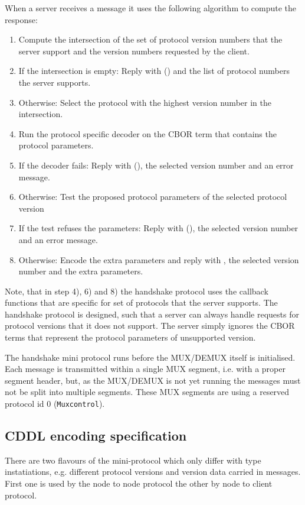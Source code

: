 When a server receives a \ProposeVersions{} message it uses the following algorithm to
compute the response:
\begin{enumerate}
\item
  Compute the intersection of the set of protocol version numbers that the server support
  and the version numbers requested by the client.
\item
  If the intersection is empty:
  Reply with \Refuse(\VersionMismatch) and the list of protocol numbers the server supports.
\item
  Otherwise:
  Select the protocol with the highest version number in the intersection.
\item
  Run the protocol specific decoder on the CBOR term that contains the protocol parameters.
\item
  If the decoder fails:
  Reply with \Refuse(\HandshakeDecodeError), the selected version number and an error message.
\item
  Otherwise: Test the proposed protocol parameters of the selected protocol version
\item
  If the test refuses the parameters:
  Reply with \Refuse(\Refused), the selected version number and an error message.
\item
  Otherwise:
  Encode the extra parameters and
  reply with \AcceptVersion, the selected version number and the extra parameters.
\end{enumerate}
Note, that in step 4), 6) and 8) the handshake protocol uses the callback functions that are specific
for set of protocols that the server supports.
The handshake protocol is designed,
such that a server can always handle requests for protocol versions that it does not support.
The server simply ignores the CBOR terms that represent the protocol parameters of unsupported
version.

The handshake mini protocol runs before the MUX/DEMUX itself is initialised.
Each message is transmitted within a single MUX segment, i.e. with a proper
segment header, but, as the MUX/DEMUX is not yet running the messages must not
be split into multiple segments.  These MUX segments are using a reserved
protocol id $0$ (\texttt{Muxcontrol}).

\subsection{CDDL encoding specification}\label{handshake-cddl}
There are two flavours of the mini-protocol which only differ with type
instatiations, e.g. different protocol versions and version data carried in
messages.  First one is used by the node to node protocol the other by node to
client protocol.

